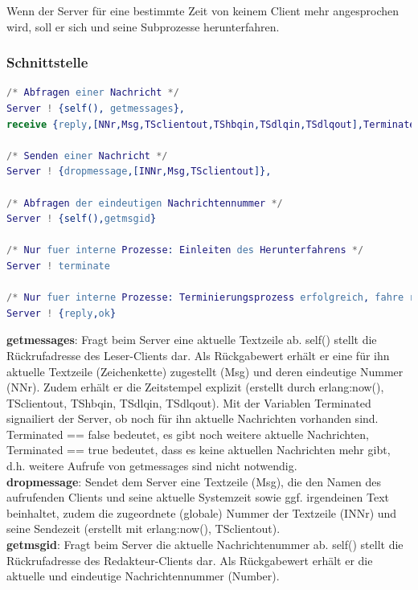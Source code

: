 \documentclass{article}
\begin{document}
Wenn der Server für eine bestimmte Zeit von keinem Client mehr angesprochen wird, soll er sich und seine Subprozesse
herunterfahren.

\subsubsection{Schnittstelle}
\begin{lstlisting}[language=erlang]
/* Abfragen einer Nachricht */
Server ! {self(), getmessages},
receive {reply,[NNr,Msg,TSclientout,TShbqin,TSdlqin,TSdlqout],Terminated}

/* Senden einer Nachricht */
Server ! {dropmessage,[INNr,Msg,TSclientout]},

/* Abfragen der eindeutigen Nachrichtennummer */
Server ! {self(),getmsgid}

/* Nur fuer interne Prozesse: Einleiten des Herunterfahrens */
Server ! terminate

/* Nur fuer interne Prozesse: Terminierungsprozess erfolgreich, fahre runter*/
Server ! {reply,ok}
\end{lstlisting}

\textbf{getmessages}: Fragt beim Server eine aktuelle Textzeile ab. self() stellt die Rückrufadresse des Leser-Clients dar. Als Rückgabewert erhält er eine für ihn aktuelle Textzeile (Zeichenkette) zugestellt (Msg) und deren eindeutige Nummer (NNr).
Zudem erhält er die Zeitstempel explizit (erstellt durch erlang:now(), TSclientout, TShbqin, TSdlqin, TSdlqout).
Mit der Variablen Terminated signailiert der Server, ob noch für ihn aktuelle Nachrichten vorhanden sind. Terminated == false bedeutet, es gibt noch weitere aktuelle Nachrichten, Terminated == true bedeutet, dass es keine aktuellen Nachrichten mehr gibt, d.h. weitere Aufrufe von getmessages sind nicht notwendig.\\

\textbf{dropmessage}: Sendet dem Server eine Textzeile (Msg), die den  Namen des aufrufenden Clients und seine aktuelle Systemzeit sowie ggf. irgendeinen Text beinhaltet, zudem die zugeordnete (globale) Nummer der Textzeile (INNr) und seine Sendezeit (erstellt mit erlang:now(), TSclientout).\\

\textbf{getmsgid}: Fragt beim Server die aktuelle Nachrichtenummer ab. self() stellt die Rückrufadresse des Redakteur-Clients dar. Als Rückgabewert erhält er die aktuelle und eindeutige Nachrichtennummer (Number).\\
\end{document}

